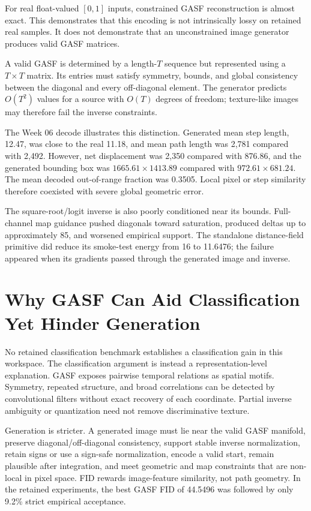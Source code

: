 \documentclass[12pt,a4paper,oneside]{report}
\begin{document}
For real float-valued $[0,1]$ inputs, constrained GASF reconstruction is almost exact. This demonstrates that this encoding is not intrinsically lossy on retained real samples. It does not demonstrate that an unconstrained image generator produces valid GASF matrices.

A valid GASF is determined by a length-$T$ sequence but represented using a $T\times T$ matrix. Its entries must satisfy symmetry, bounds, and global consistency between the diagonal and every off-diagonal element. The generator predicts $O(T^2)$ values for a source with $O(T)$ degrees of freedom; texture-like images may therefore fail the inverse constraints.

The Week 06 decode illustrates this distinction. Generated mean step length, 12.47, was close to the real 11.18, and mean path length was 2,781 compared with 2,492. However, net displacement was 2,350 compared with 876.86, and the generated bounding box was $1665.61\times1413.89$ compared with $972.61\times681.24$. The mean decoded out-of-range fraction was 0.3505. Local pixel or step similarity therefore coexisted with severe global geometric error.

The square-root/logit inverse is also poorly conditioned near its bounds. Full-channel map guidance pushed diagonals toward saturation, produced deltas up to approximately 85, and worsened empirical support. The standalone distance-field primitive did reduce its smoke-test energy from 16 to 11.6476; the failure appeared when its gradients passed through the generated image and inverse.

\section{Why GASF Can Aid Classification Yet Hinder Generation}

No retained classification benchmark establishes a classification gain in this workspace. The classification argument is instead a representation-level explanation. GASF exposes pairwise temporal relations as spatial motifs. Symmetry, repeated structure, and broad correlations can be detected by convolutional filters without exact recovery of each coordinate. Partial inverse ambiguity or quantization need not remove discriminative texture.

Generation is stricter. A generated image must lie near the valid GASF manifold, preserve diagonal/off-diagonal consistency, support stable inverse normalization, retain signs or use a sign-safe normalization, encode a valid start, remain plausible after integration, and meet geometric and map constraints that are non-local in pixel space. FID rewards image-feature similarity, not path geometry. In the retained experiments, the best GASF FID of 44.5496 was followed by only 9.2\% strict empirical acceptance.
\end{document}
